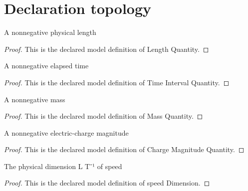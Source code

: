 \section{Declaration topology}
\begin{definition}
  \label{def:physics:phyx-mini-0640:phyxminiproblems-problemphyxmini0640-lengthquantity}
  A nonnegative physical length
\end{definition}
\begin{proof}
  This is the declared model definition of Length Quantity.
\end{proof}
\begin{definition}
  \label{def:physics:phyx-mini-0640:phyxminiproblems-problemphyxmini0640-timeintervalquantity}
  A nonnegative elapsed time
\end{definition}
\begin{proof}
  This is the declared model definition of Time Interval Quantity.
\end{proof}
\begin{definition}
  \label{def:physics:phyx-mini-0640:phyxminiproblems-problemphyxmini0640-massquantity}
  A nonnegative mass
\end{definition}
\begin{proof}
  This is the declared model definition of Mass Quantity.
\end{proof}
\begin{definition}
  \label{def:physics:phyx-mini-0640:phyxminiproblems-problemphyxmini0640-chargemagnitudequantity}
  A nonnegative electric-charge magnitude
\end{definition}
\begin{proof}
  This is the declared model definition of Charge Magnitude Quantity.
\end{proof}
\begin{definition}
  \label{def:physics:phyx-mini-0640:phyxminiproblems-problemphyxmini0640-speeddimension}
  The physical dimension L T⁻¹ of speed
\end{definition}
\begin{proof}
  This is the declared model definition of speed Dimension.
\end{proof}
